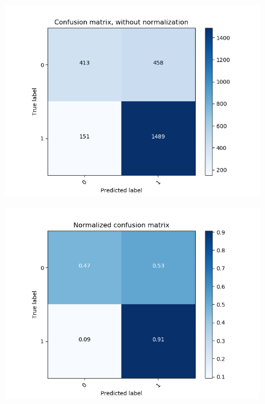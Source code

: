\begin{figure}
\begin{minipage}[b]{0.45\columnwidth}
		\centering
		\includegraphics[clip, width=\linewidth]{fig/chapter4/3d/confusion_matrix/count_confusion_matrix_False_50_gru}
		\label{fig: count_he_preprocess}
	\end{minipage}
	\begin{minipage}[b]{0.45\columnwidth}
		\centering
		\includegraphics[clip, width=\linewidth]{fig/chapter4/3d/confusion_matrix/normalized_confusion_matrix_False_50_gru}
		\label{fig: he_preprocess}
	\end{minipage}
	\begin{minipage}[b]{0.45\columnwidth}
		\centering

\end{minipage}
\end{figure}
